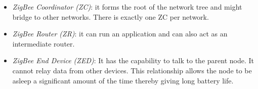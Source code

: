 \begin{itemize}
{\begin{itemize}
\item{\emph{ZigBee Coordinator (ZC)}: it forms the root of the network tree and might bridge to other networks. There is exactly one ZC per network. }
\item{\emph{ZigBee Router (ZR)}: it can run an application and can also act as an intermediate router. }
\item{\emph{ZigBee End Device (ZED)}: It has the capability to talk to the parent node. It cannot relay data from other devices. This relationship allows the node to be asleep a significant amount of the time thereby giving long battery life.}
\end{itemize}
}
\end{itemize}

